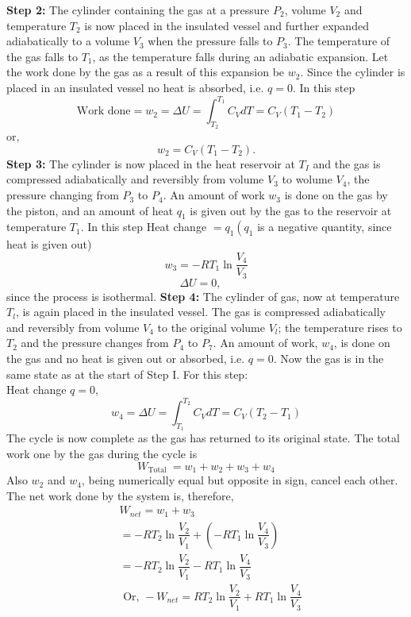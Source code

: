 \documentclass[a4paper,12pt,twocolumn]{article}
\begin{document}
\textbf{Step 2:} The cylinder containing the gas at a pressure $P_2$, volume $V_2$ and temperature $T_2$ is now placed in the insulated vessel and further expanded adiabatically to a volume $V_3$ when the pressure falls to $P_3$. The temperature of the gas falls to $T_1$, as the temperature falls during an adiabatic expansion. Let the work done by the gas as a result of this expansion be $w_2$. Since the cylinder is placed in an insulated vessel no heat is absorbed, i.e. $q=0$. In this step
$$
\text {Work done}=w_2=\Delta U=\int_{T_2}^{T_1} C_V d T=C_V\left(T_1-T_2\right)
$$
or,
$$
w_2=C_V\left(T_1-T_2\right) .
$$
\textbf{Step 3:} The cylinder is now placed in the heat reservoir at $T_I$ and the gas is compressed adiabatically and reversibly from volume $V_3$ to wolume $V_4$, the pressure changing from $P_3$ to $P_4$. An amount of work $w_3$ is done on the gas by the piston, and an amount of heat $q_1$ is given out by the gas to the reservoir at temperature $T_1$. In this step
Heat change $=q_1\left(q_1\right.$ is a negative quantity, since heat is given out)
$$
w_3=-R T_1 \ln  \dfrac{V_4}{V_3}
$$
$$\Delta U=0, \quad$$ since the process is isothermal.
\newline
\newline
\textbf{Step 4:} The cylinder of gas, now at temperature $T_l$, is again placed in the insulated vessel. The gas is compressed adiabatically and reversibly from volume $V_4$ to the original volume $V_l$; the temperature rises to $T_2$ and the pressure changes from $P_4$ to $P_7$. An amount of work, $w_4$, is done on the gas and no heat is given out or absorbed, i.e. $q=0$. Now the gas is in the same state as at the start of Step I. For this step:\\
Heat change $q=0$,
$$
w_4=\Delta U=\int_{T_1}^{T_2} C_V d T=C_V\left(T_2-T_1\right)
$$
The cycle is now complete as the gas has returned to its original state. The total work one by the gas during the cycle is
$$
W_{\text {Total }}=w_1+w_2+w_3+w_4
$$
Also $w_2$ and $w_4$, being numerically equal but opposite in sign, cancel each other. The net work done by the system is, therefore,
$$
\begin{aligned}
& W_{n e t}=w_1+w_3 \\
&=-R T_2 \ln  \dfrac{V_2}{V_1}+\left(-R T_1 \ln  \dfrac{V_4}{V_3}\right) \\
&=-R T_2 \ln  \dfrac{V_2}{V_1}-R T_1 \ln  \dfrac{V_4}{V_3} \\
& \text { Or, }-W_{n e t}=R T_2 \ln  \dfrac{V_2}{V_1}+R T_1 \ln  \dfrac{V_4}{V_3} \\
\end{aligned}
$$
\end{document}
